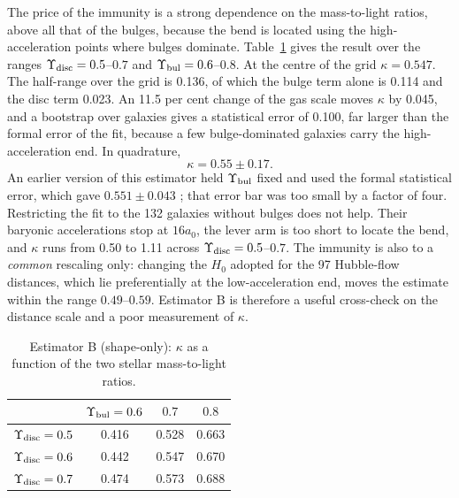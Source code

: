 \documentclass[fleqn,usenatbib]{mnras}
\begin{document}
The price of the immunity is a strong dependence on the mass-to-light ratios, above all that of the bulges, because the bend is located using the high-acceleration points where bulges dominate. Table~\ref{tab:shape} gives the result over the ranges $\Upsilon_{\rm disc}=0.5$--$0.7$ and $\Upsilon_{\rm bul}=0.6$--$0.8$. At the centre of the grid $\kappa=0.547$. The half-range over the grid is 0.136, of which the bulge term alone is 0.114 and the disc term 0.023. An 11.5 per cent change of the gas scale moves $\kappa$ by 0.045, and a bootstrap over galaxies gives a statistical error of 0.100, far larger than the formal error of the fit, because a few bulge-dominated galaxies carry the high-acceleration end. In quadrature,
\begin{equation}
\kappa=0.55\pm0.17 .
\label{eq:kappaB}
\end{equation}
An earlier version of this estimator held $\Upsilon_{\rm bul}$ fixed and used the formal statistical error, which gave $0.551\pm0.043$ \citep{Zimmerman2026kappa}; that error bar was too small by a factor of four. Restricting the fit to the 132 galaxies without bulges does not help. Their baryonic accelerations stop at $16a_0$, the lever arm is too short to locate the bend, and $\kappa$ runs from 0.50 to 1.11 across $\Upsilon_{\rm disc}=0.5$--$0.7$. The immunity is also to a \emph{common} rescaling only: changing the $H_0$ adopted for the 97 Hubble-flow distances, which lie preferentially at the low-acceleration end, moves the estimate within the range $0.49$--$0.59$. Estimator B is therefore a useful cross-check on the distance scale and a poor measurement of $\kappa$.

\begin{table}
\caption{Estimator B (shape-only): $\kappa$ as a function of the two stellar mass-to-light ratios.}
\label{tab:shape}
\begin{tabular}{lccc}
\toprule
 & $\Upsilon_{\rm bul}=0.6$ & $0.7$ & $0.8$\\
\midrule
$\Upsilon_{\rm disc}=0.5$ & 0.416 & 0.528 & 0.663\\
$\Upsilon_{\rm disc}=0.6$ & 0.442 & 0.547 & 0.670\\
$\Upsilon_{\rm disc}=0.7$ & 0.474 & 0.573 & 0.688\\
\bottomrule
\end{tabular}
\end{table}
\end{document}
